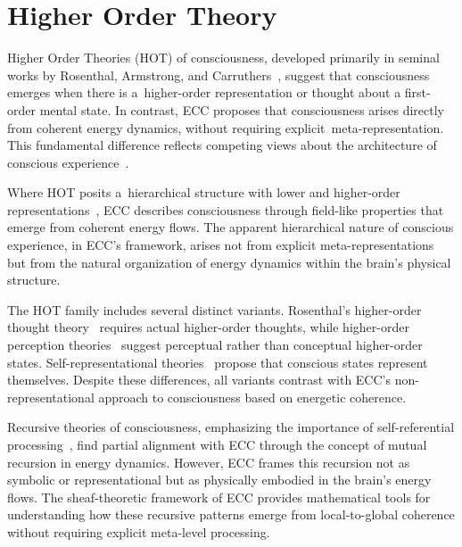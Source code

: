 \section{Higher Order Theory}

Higher Order Theories (HOT) of consciousness, developed primarily in seminal works by Rosenthal, Armstrong, and Carruthers~\cite{Rosenthal2005, Armstrong1968, Carruthers2000}, suggest that consciousness emerges when there is a~higher-order representation or thought about a first-order mental state. In contrast, ECC proposes that consciousness arises directly from coherent energy dynamics, without requiring explicit~meta-representation. This fundamental difference reflects competing views about the architecture of conscious experience~\cite{Lycan1996, Block2020}.

Where HOT posits a~hierarchical structure with lower and higher-order representations~\cite{Carruthers2000, Brown2019}, ECC describes consciousness through field-like properties that emerge from coherent energy flows. The apparent hierarchical nature of conscious experience, in ECC's framework, arises not from explicit meta-representations but from the natural organization of energy dynamics within the brain's physical structure.

The HOT family includes several distinct variants. Rosenthal's higher-order thought theory~\cite{Rosenthal2005} requires actual higher-order thoughts, while higher-order perception theories~\cite{Lycan1996} suggest perceptual rather than conceptual higher-order states. Self-representational theories~\cite{Kriegel2009, Gennaro2012} propose that conscious states represent themselves. Despite these differences, all variants contrast with ECC's non-representational approach to consciousness based on energetic coherence.

Recursive theories of consciousness, emphasizing the importance of self-referential processing~\cite{Hofstadter2007, Cleeremans2011}, find partial alignment with ECC through the concept of mutual recursion in energy dynamics. However, ECC frames this recursion not as symbolic or representational but as physically embodied in the brain's energy flows. The sheaf-theoretic framework of ECC provides mathematical tools for understanding how these recursive patterns emerge from local-to-global coherence without requiring explicit meta-level processing.

